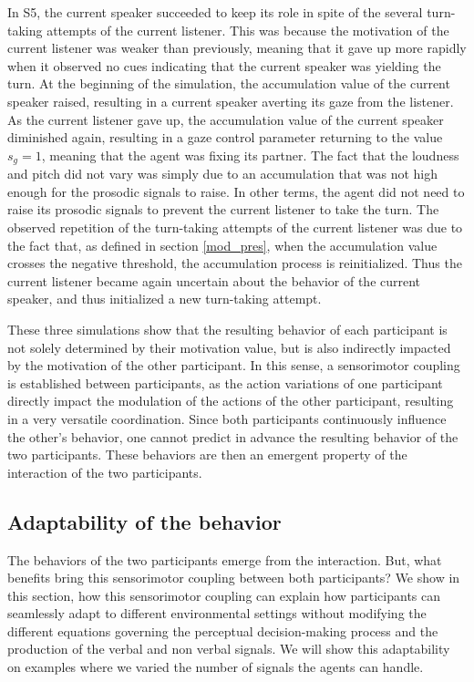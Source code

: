 In S5, the current speaker succeeded to keep its role in spite of the several turn-taking attempts of the current listener. This was because the motivation of the current listener was weaker than previously, meaning that it gave up more rapidly when it observed no cues indicating that the current speaker was yielding the turn. At the beginning of the simulation, the accumulation value of the current speaker raised, resulting in a current speaker averting its gaze from the listener. As the current listener gave up, the accumulation value of the current speaker diminished again, resulting in a gaze control parameter returning to the value $s_g=1$, meaning that the agent was fixing its partner. The fact that the loudness and pitch did not vary was simply due to an accumulation that was not high enough for the prosodic signals to raise. In other terms, the agent did not need to raise its prosodic signals to prevent the current listener to take the turn. The observed repetition of the turn-taking attempts of the current listener was due to the fact that, as defined in section \ref{mod_pres}, when the accumulation value crosses the negative threshold, the accumulation process is reinitialized. Thus the current listener became again uncertain about the behavior of the current speaker, and thus initialized a new turn-taking attempt. 


These three simulations show that the resulting behavior of each participant is not solely determined by their motivation value, but is also indirectly impacted by the motivation of the other participant. In this sense, a sensorimotor coupling is established between participants, as the action variations of one participant directly impact the modulation of the actions of the other participant, resulting in a very versatile coordination. Since both participants continuously influence the other's behavior, one cannot predict in advance the resulting behavior of the two participants. These behaviors are then an emergent property of the interaction of the two participants. 

\subsection{Adaptability of the behavior}

The behaviors of the two participants emerge from the interaction. But, what benefits bring this sensorimotor coupling between both participants?
We show in this section, how this sensorimotor coupling can explain how participants can seamlessly adapt to different environmental settings without modifying the different equations governing the perceptual decision-making process and the production of the verbal and non verbal signals. We will show this adaptability on examples where we varied the number of signals the agents can handle. 

